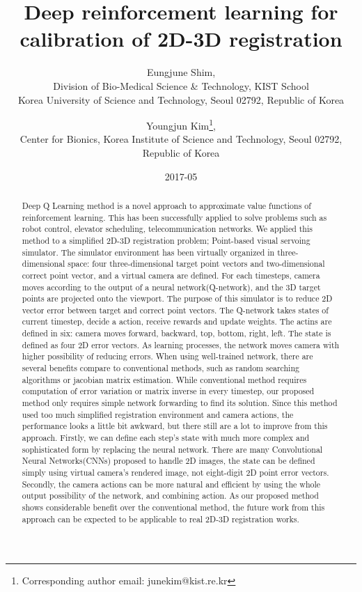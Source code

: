\documentclass[10pt]{article}
\begin{document}
\title{Deep reinforcement learning for calibration of 2D-3D registration}

\author{Eungjune Shim, \\
Division of Bio-Medical Science \& Technology, KIST School \\
Korea University of Science and Technology, Seoul 02792, Republic of Korea
\and Youngjun Kim\thanks{Corresponding author email: junekim@kist.re.kr},
\\ Center for Bionics, Korea Institute of Science and Technology, Seoul 02792, Republic of Korea}

\date{2017-05}
\maketitle

\begin{abstract}
 Deep Q Learning method is a novel approach to approximate value functions of reinforcement learning. This has been successfully applied to solve problems such as robot control, elevator scheduling, telecommunication networks. We applied this method to a simplified 2D-3D registration problem; Point-based visual servoing simulator. The simulator environment has been virtually organized in three-dimensional space: four three-dimensional target point vectors and two-dimensional correct point vector, and a virtual camera are defined. For each timesteps, camera moves according to the output of a neural network(Q-network), and the 3D target points are projected onto the viewport. The purpose of this simulator is to reduce 2D vector error between target and correct point vectors. The Q-network takes states of current timestep, decide a action, receive rewards and update weights. The actins are defined in six: camera moves forward, backward, top, bottom, right, left. The state is defined as four 2D error vectors. As learning processes, the network moves camera with higher possibility of reducing errors. When using well-trained network, there are several benefits compare to conventional methods, such as random searching algorithms or jacobian matrix estimation. While conventional method requires computation of error variation or matrix inverse in every timestep, our proposed method only requires simple network forwarding to find its solution. Since this method used too much simplified registration environment and camera actions, the performance looks a little bit awkward, but there still are a lot to improve from this approach. Firstly, we can define each step's state with much more complex and sophisticated form by replacing the neural network. There are many Convolutional Neural Networks(CNNs) proposed to handle 2D images, the state can be defined simply using virtual camera's rendered image, not eight-digit 2D point error vectors. Secondly, the camera actions can be more natural and efficient by using the whole output possibility of the network, and combining action. As our proposed method shows considerable benefit over the conventional method, the future work from this approach can be expected to be applicable to real 2D-3D registration works.


\end{abstract}
\end{document}
